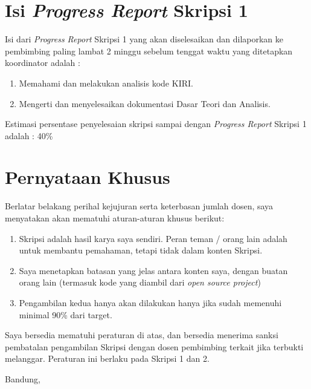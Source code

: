 \documentclass[a4paper,twoside]{article}
\begin{document}
\section{Isi {\it Progress Report} Skripsi 1}
Isi dari {\it Progress Report} Skripsi 1 yang akan diselesaikan dan dilaporkan ke pembimbing paling lambat 2 minggu sebelum tenggat waktu yang ditetapkan koordinator adalah :
\begin{enumerate}
	\item Memahami  dan melakukan analisis kode KIRI.
	\item Mengerti dan menyelesaikan dokumentasi Dasar Teori dan Analisis.
\end{enumerate}
Estimasi persentase penyelesaian skripsi sampai dengan {\it Progress Report} Skripsi 1 adalah : 40\%

\section{Pernyataan Khusus}
Berlatar belakang perihal kejujuran serta keterbasan jumlah dosen, saya menyatakan akan mematuhi aturan-aturan khusus berikut:
\begin{enumerate}
	\item Skripsi adalah hasil karya saya sendiri. Peran teman / orang lain adalah untuk membantu pemahaman, tetapi tidak dalam konten Skripsi.
	\item Saya menetapkan batasan yang jelas antara konten saya, dengan buatan orang lain (termasuk kode yang diambil dari {\it open source project})
	\item Pengambilan kedua hanya akan dilakukan hanya jika sudah memenuhi minimal 90\% dari target.
\end{enumerate}
Saya bersedia mematuhi peraturan di atas, dan bersedia menerima sanksi pembatalan pengambilan Skripsi dengan dosen pembimbing terkait jika terbukti melanggar. Peraturan ini berlaku pada Skripsi 1 dan 2.

\vspace{1.5cm}

\centering Bandung, \tanggal\\
\vspace{2cm} \nama \\ 
\vspace{5cm}
\end{document}
